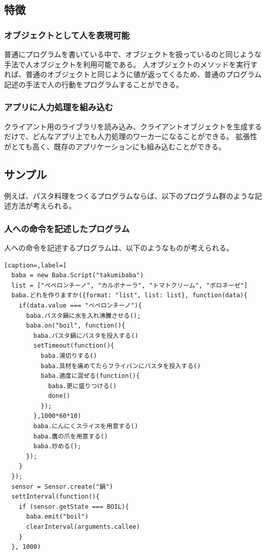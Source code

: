 \documentclass{deimj}
\begin{document}
\subsection{特徴}
\subsubsection{オブジェクトとして人を表現可能}
普通にプログラムを書いている中で、オブジェクトを扱っているのと同じような手法で人オブジェクトを利用可能である。
人オブジェクトのメソッドを実行すれば、普通のオブジェクトと同じように値が返ってくるため、普通のプログラム記述の手法で人の行動をプログラムすることができる。

\subsubsection{アプリに人力処理を組み込む}
クライアント用のライブラリを読み込み、クライアントオブジェクトを生成するだけで、どんなアプリ上でも人力処理のワーカーになることができる。
拡張性がとても高く、既存のアプリケーションにも組み込むことができる。

\subsection{サンプル}
例えば、パスタ料理をつくるプログラムならば、以下のプログラム群のような記述方法が考えられる。

\subsubsection{人への命令を記述したプログラム}
人への命令を記述するプログラムは、以下のようなものが考えられる。

\begin{lstlisting}[caption=,label=]
  baba = new Baba.Script("takumibaba")
  list = ["ペペロンチーノ", "カルボナーラ", "トマトクリーム", "ボロネーゼ"]
  baba.どれを作りますか({format: "list", list: list}, function(data){
    if(data.value === "ペペロンチーノ"){
      baba.パスタ鍋に水を入れ沸騰させる();
      baba.on("boil", function(){
        baba.パスタ鍋にパスタを投入する()
        setTimeout(function(){
          baba.湯切りする()
          baba.具材を痛めてたらフライパンにパスタを投入する()
          baba.適度に混ぜる(function(){
            baba.更に盛りつける()
            done()
          });
        },1000*60*10)
        baba.にんにくスライスを用意する()
        baba.鷹の爪を用意する()
        baba.炒める();
      });
    }
  });
  sensor = Sensor.create("鍋")
  settInterval(function(){
    if (sensor.getState === BOIL){
      baba.emit("boil")
      clearInterval(arguments.callee)
    }
  }, 1000)
\end{lstlisting}
  
\end{document}
